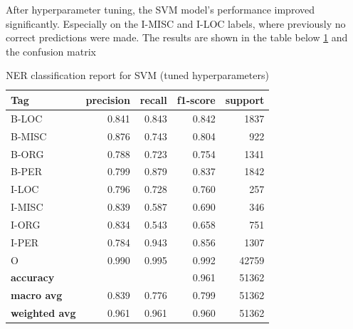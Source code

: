 \documentclass[11pt]{article}
\begin{document}
After hyperparameter tuning, the SVM model's performance improved significantly.
Especially on the I-MISC and I-LOC labels, where previously no correct predictions were made.
The results are shown in the table below \ref{tab:evaluation report SVM tuned} and the confusion matrix
\begin{table}[h]
    \centering
    \caption{NER classification report for SVM (tuned hyperparameters)}
    \label{tab:evaluation report SVM tuned}
    \begin{tabular}{l rrrr}
        \toprule
        \textbf{Tag}          & \textbf{precision}   & \textbf{recall} & \textbf{f1-score} & \textbf{support} \\
        \midrule
        B-LOC                 & 0.841                & 0.843           & 0.842             & 1837             \\
        B-MISC                & 0.876                & 0.743           & 0.804             & 922              \\
        B-ORG                 & 0.788                & 0.723           & 0.754             & 1341             \\
        B-PER                 & 0.799                & 0.879           & 0.837             & 1842             \\
        I-LOC                 & 0.796                & 0.728           & 0.760             & 257              \\
        I-MISC                & 0.839                & 0.587           & 0.690             & 346              \\
        I-ORG                 & 0.834                & 0.543           & 0.658             & 751              \\
        I-PER                 & 0.784                & 0.943           & 0.856             & 1307             \\
        O                     & 0.990                & 0.995           & 0.992             & 42759            \\
        \midrule
        \textbf{accuracy}     & \multicolumn{2}{c}{} & 0.961           & 51362                                \\
        \textbf{macro avg}    & 0.839                & 0.776           & 0.799             & 51362            \\
        \textbf{weighted avg} & 0.961                & 0.961           & 0.960             & 51362            \\
        \bottomrule
    \end{tabular}
\end{table}
\end{document}
